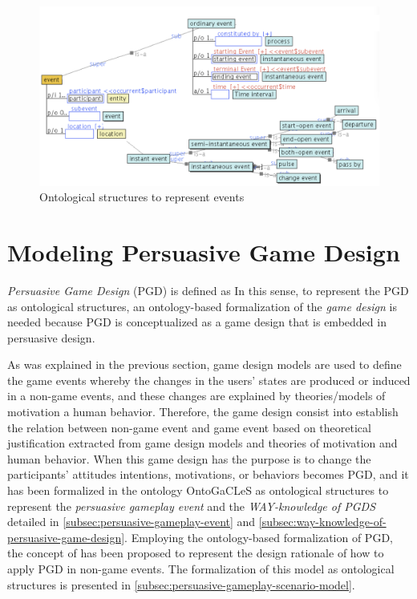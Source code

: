 \begin{figure}[!htb]
 \caption{Ontological structures to represent events}
 \label{fig:ontological-structures-event}
 \centering
 \includegraphics[width=1\textwidth]{images/chap-ontogacles2/ontological-structures-event.png}
 \fautor
\end{figure}

\section[Modeling Persuasive Game Design]{Modeling Persuasive Game Design}
\label{sec:modeling-persuasive-game-design}

\emph{Persuasive Game Design} (PGD) is defined as  In this sense, to represent the PGD as ontological structures, an ontology-based formalization of the \emph{game design} is needed because PGD is conceptualized as a game design that is embedded in persuasive design.

As was explained in the previous section, game design models are used to define the game events whereby the changes in the users’ states are produced or induced in a non-game events, and these changes are explained by theories/models of motivation a human behavior. Therefore, the game design consist into establish the relation between non-game event and game event based on theoretical justification extracted from game design models and theories of motivation and human behavior. When this game design has the purpose is to change the participants' attitudes intentions, motivations, or behaviors becomes PGD, and it has been formalized in the ontology OntoGaCLeS as ontological structures to represent the \emph{persuasive gameplay event} and the \emph{WAY-knowledge of PGDS} detailed in \autoref{subsec:persuasive-gameplay-event} and \autoref{subsec:way-knowledge-of-persuasive-game-design}. Employing the ontology-based formalization of PGD, the concept of  has been proposed to represent the design rationale of how to apply PGD in non-game events. The formalization of this model as ontological structures is presented in \autoref{subsec:persuasive-gameplay-scenario-model}.


